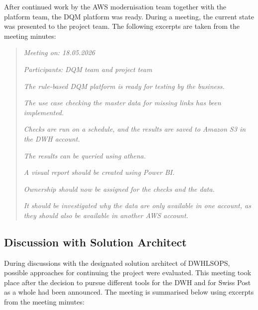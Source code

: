 After continued work by the AWS modernisation team together with the platform team, the \gls{DQM} platform was ready. During a meeting, the current state was presented to the project team. The following excerpts are taken from the meeting minutes:



\begin{quote}
\textit{Meeting on: 18.05.2026}

\textit{Participants: DQM team and project team}

\textit{The rule-based DQM platform is ready for testing by the business.}

\textit{The use case checking the master data for missing links has been implemented.}

\textit{Checks are run on a schedule, and the results are saved to Amazon S3 in the DWH account.}

\textit{The results can be queried using \gls{athena}.}

\textit{A visual report should be created using Power BI.}

\textit{Ownership should now be assigned for the checks and the data.}

\textit{It should be investigated why the data are only available in one account, as they should also be available in another AWS account.}
\end{quote}



\subsection*{Discussion with Solution Architect}

During discussions with the designated solution architect of \gls{DWHLSOPS}, possible approaches for continuing the project were evaluated. This meeting took place after the decision to pursue different tools for the DWH and for Swiss Post as a whole had been announced. The meeting is summarised below using excerpts from the meeting minutes:

